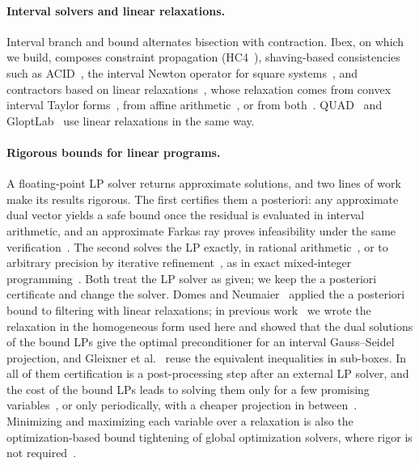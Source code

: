 \documentclass[11pt]{article}
\theoremstyle{definition}
\theoremstyle{remark}
\begin{document}
\paragraph{Interval solvers and linear relaxations.}
Interval branch and bound alternates bisection with contraction. Ibex, on
which we build, composes constraint propagation (HC4~\cite{benhamou1999revising}),
shaving-based consistencies such as ACID~\cite{neveu2015adaptive}, the interval
Newton operator for square systems~\cite{neumaier1990interval}, and contractors
based on linear relaxations~\cite{chabert2009contractor}, whose relaxation
comes from convex interval Taylor forms~\cite{araya2012xnewton}, from affine
arithmetic~\cite{ninin2015affine}, or from both~\cite{araya2025hybridizing}.
QUAD~\cite{lebbah2005quad} and GloptLab~\cite{domes2012rigorous} use linear
relaxations in the same way.

\paragraph{Rigorous bounds for linear programs.}
A floating-point LP solver returns approximate solutions, and two lines of
work make its results rigorous. The first certifies them a posteriori: any
approximate dual vector yields a safe bound once the residual is evaluated in
interval arithmetic, and an approximate Farkas ray proves infeasibility under
the same verification~\cite{neumaier2004safe,jansson2004rigorous,keil2006computational}.
The second solves the LP exactly, in rational
arithmetic~\cite{applegate2007exact}, or to arbitrary precision by iterative
refinement~\cite{gleixner2016iterative}, as in exact mixed-integer
programming~\cite{cook2013hybrid}. Both treat the LP solver as given; we keep
the a posteriori certificate and change the solver. Domes and
Neumaier~\cite{domes2012rigorous} applied the a posteriori bound to filtering
with linear relaxations; in previous work~\cite{reyes2023preconditioning} we
wrote the relaxation in the homogeneous form used here and showed that the
dual solutions of the bound LPs give the optimal preconditioner for an
interval Gauss--Seidel projection, and Gleixner et
al.~\cite{gleixner2017three} reuse the equivalent inequalities in sub-boxes.
In all of them certification is a post-processing step after an external
LP solver, and the cost of the bound LPs leads to solving them only for a few
promising variables~\cite{domes2012rigorous}, or only periodically, with a
cheaper projection in between~\cite{reyes2023preconditioning}. Minimizing and maximizing
each variable over a relaxation is also the optimization-based bound
tightening of global optimization solvers, where rigor is not
required~\cite{ryoo1996branch,belotti2009branching,gleixner2017three}.
\end{document}
